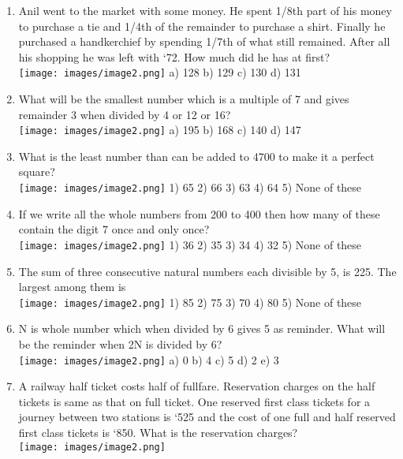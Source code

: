\documentclass[
]{article}
\begin{document}
\begin{enumerate}
\item Anil went to the market with some money. He spent 1/8th  part of his money to purchase a tie and 1/4th  of the remainder to purchase a shirt. Finally he purchased a handkerchief by spending 1/7th  of what still remained. After all his shopping he was left with `72. How much did he has at first? \\
\texttt{[image: images/image2.png]} a) 128 	b) 129 	c) 130 	d) 131
\item What will be the smallest number which is a multiple of 7 and gives remainder 3 when divided by 4 or 12 or 16?  \\
\texttt{[image: images/image2.png]} a) 195 	b) 168 	c) 140 	d) 147
\item What is the least number than can be added to 4700 to make it a perfect square?  \\
\texttt{[image: images/image2.png]} 1) 65 	2) 66 	3) 63 	4) 64 	5) None of these
	\item If we write all the whole numbers from 200 to 400 then how many of these contain the digit 7 once and only once? \\
\texttt{[image: images/image2.png]} 1) 36 	2) 35 	3) 34 	4) 32 	5) None of these
	\item The sum of three consecutive natural numbers each divisible by 5, is 225. The largest among them is  \\
	\texttt{[image: images/image2.png]} 1) 85 	2) 75 	3) 70 	4) 80 	5) None of these
\item N is whole number which when divided by 6 gives 5 as reminder. What will be the reminder when 2N is divided by 6?  \\
\texttt{[image: images/image2.png]} a) 0 	b) 4 	c) 5 	d) 2 	e) 3
\item A railway half ticket costs half of fullfare. Reservation charges on the half tickets is same as that on full ticket. One reserved first class tickets for a journey between two stations is `525 and the cost of one full and half reserved first class tickets is `850. What is the reservation charges? \\
\texttt{[image: images/image2.png]} 


\end{enumerate}
\end{document}
